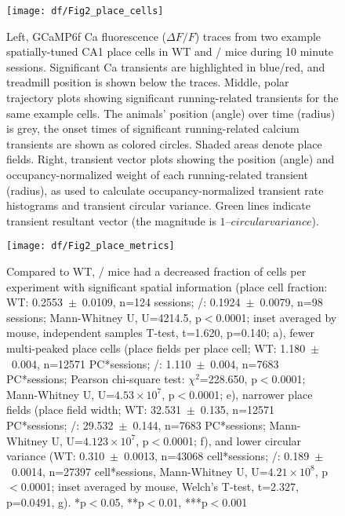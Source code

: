 \begin{figure}
	\centering
	\texttt{[image: df/Fig2\_place\_cells]}
	\caption[Example Ca traces and spatial tuning]{Left, GCaMP6f Ca fluorescence ($\Delta F/F$) traces from two example spatially-tuned CA1 place cells in WT and \df/ mice during 10 minute sessions. Significant Ca transients are highlighted in blue/red, and treadmill position is shown below the traces.
	Middle, polar trajectory plots showing significant running-related transients for the same example cells. The animals' position (angle) over time (radius) is grey, the onset times of significant running-related calcium transients are shown as colored circles. Shaded areas denote place fields. 
	Right, transient vector plots showing the position (angle) and occupancy-normalized weight of each running-related transient (radius), as used to calculate occupancy-normalized transient rate histograms and transient circular variance. Green lines indicate transient resultant vector (the magnitude is $1 – circular variance$).}
	\label{fig:df:place_cells}
\end{figure}

\begin{figure}
	\centering
	\texttt{[image: df/Fig2\_place\_metrics]}
	\caption[Comparison of place cell metrics]{Compared to WT, \df/ mice had a decreased fraction of cells per experiment with significant spatial information (place cell fraction: WT: 0.2553~$\pm$~0.0109, n=124 sessions; \df/: 0.1924~$\pm$~0.0079, n=98 sessions; Mann-Whitney U, U=4214.5, p$<$0.0001; inset averaged by mouse, independent samples T-test, t=1.620, p=0.140; a), fewer multi-peaked place cells (place fields per place cell; WT: 1.180~$\pm$~0.004, n=12571 PC*sessions; \df/: 1.110~$\pm$~0.004, n=7683 PC*sessions; Pearson chi-square test: $\chi^2$=228.650, p$<$0.0001; Mann-Whitney U, U=$4.53\times10^7$, p$<$0.0001; e), narrower place fields (place field width; WT: 32.531~$\pm$~0.135, n=12571 PC*sessions; \df/: 29.532~$\pm$~0.144, n=7683 PC*sessions; Mann-Whitney U, U=$4.123\times10^7$, p$<$0.0001; f), and lower circular variance (WT: 0.310~$\pm$~0.0013, n=43068 cell*sessions; \df/: 0.189~$\pm$~0.0014, n=27397 cell*sessions, Mann-Whitney U, U=$4.21\times10^8$, p$<$0.0001; inset averaged by mouse, Welch's T-test, t=2.327, p=0.0491, g). *p$<$0.05, **p$<$0.01, ***p$<$0.001}
	\label{fig:df:place_metrics}
\end{figure}

